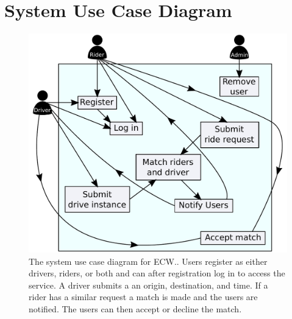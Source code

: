 \documentclass{article}
\newcommand{\namep}{ECW.}
\begin{document}
\section{System Use Case Diagram}
\begin{figure}[!htpb]
    \centering
    \includegraphics[scale=0.75]{system_case_diagram.pdf}
    \caption{The system use case diagram for \namep. Users register as either drivers, riders, or both and can after registration log in to access the service. A driver submits a an origin, destination, and time. If a rider has a similar request a match is made and the users are notified. The users can then accept or decline the match.}
    \label{fig:useCaseDiagram}
\end{figure}

\newpage
\end{document}
